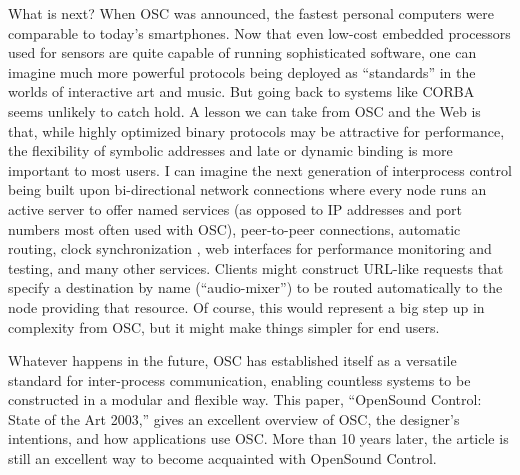 What is next? When OSC was announced, the fastest personal computers were comparable to today's smartphones. Now that even low-cost embedded processors used for sensors are quite capable of running sophisticated software, one can imagine much more powerful protocols being deployed as ``standards'' in the worlds of interactive art and music. But going back to systems like CORBA seems unlikely to catch hold. A lesson we can take from OSC and the Web is that, while highly optimized binary protocols may be attractive for performance, the flexibility of symbolic addresses and late or dynamic binding is more important to most users. I can imagine the next generation of interprocess control being built upon bi-directional network connections where every node runs an active server to offer named services (as opposed to IP addresses and port numbers most often used with OSC), peer-to-peer connections, automatic routing, clock synchronization \cite{Brandt:1999}, web interfaces for performance monitoring and testing, and many other services. Clients might construct URL-like requests that specify a destination by name (``audio-mixer'') to be routed automatically to the node providing that resource. Of course, this would represent a big step up in complexity from OSC, but it might make things simpler for end users.

Whatever happens in the future, OSC has established itself as a versatile standard for inter-process communication, enabling countless systems to be constructed in a modular and flexible way. This paper, ``OpenSound Control: State of the Art 2003,'' gives an excellent overview of OSC, the designer's intentions, and how applications use OSC. More than 10 years later, the article is still an excellent way to become acquainted with OpenSound Control.
